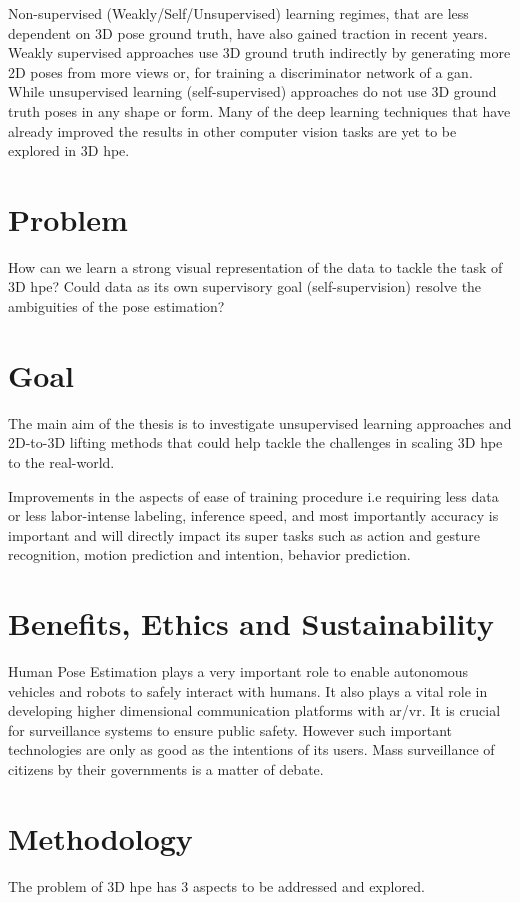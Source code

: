 Non-supervised (Weakly/Self/Unsupervised) learning regimes, that are less dependent on 3D pose ground truth, have also gained traction in recent years. Weakly supervised approaches use 3D ground truth indirectly by generating more 2D poses from more views or, for training a discriminator network of a \ac{gan}. While unsupervised learning (self-supervised) approaches do not use 3D ground truth poses in any shape or form. Many of the deep learning techniques that have already improved the results in other computer vision tasks are yet to be explored in 3D \ac{hpe}. 

\section{Problem}
\label{sec:problem}
How can we learn a strong visual representation of the data to tackle the task of 3D \ac{hpe}? Could data as its own supervisory goal (self-supervision) resolve the ambiguities of the pose estimation?

\section{Goal}
\label{sec:goal}
The main aim of the thesis is to investigate unsupervised learning approaches and 2D-to-3D lifting methods that could help tackle the challenges in scaling 3D \ac{hpe} to the real-world.

Improvements in the aspects of ease of training procedure i.e requiring less data or less labor-intense labeling, inference speed, and most importantly accuracy is important and will directly impact its super tasks such as action and gesture recognition, motion prediction and intention, behavior prediction.

\section{Benefits, Ethics and Sustainability}
Human Pose Estimation plays a very important role to enable autonomous vehicles and robots to safely interact with humans. It also plays a vital role in developing higher dimensional communication platforms with \ac{ar/vr}. It is crucial for surveillance systems to ensure public safety. However such important technologies are only as good as the intentions of its users. Mass surveillance of citizens by their governments is a matter of debate.

\section{Methodology}
\label{sec:methodology}
The problem of 3D \ac{hpe} has 3 aspects to be addressed and explored.

